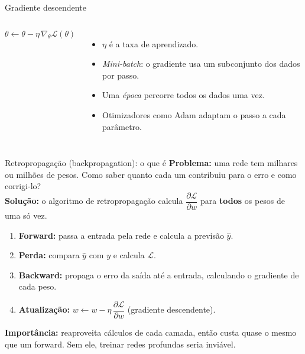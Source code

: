 \documentclass[10pt]{beamer}
\begin{document}
\begin{frame}{Gradiente descendente}
\begin{columns}[c]
\[ \theta\leftarrow\theta-\eta\,\nabla_\theta\mathcal{L}(\theta) \]
\begin{itemize}\small
 \item $\eta$ é a taxa de aprendizado.
 \item \textit{Mini-batch}: o gradiente usa um subconjunto dos dados por passo.
 \item Uma \textit{época} percorre todos os dados uma vez.
 \item Otimizadores como Adam adaptam o passo a cada parâmetro.
\end{itemize}
\end{columns}
\end{frame}

\begin{frame}{Retropropagação (backpropagation): o que é}
\textbf{Problema:} uma rede tem milhares ou milhões de pesos. Como saber quanto cada um contribuiu para o erro e como corrigi-lo?\\[2mm]
\textbf{Solução:} o algoritmo de retropropagação calcula $\dfrac{\partial\mathcal{L}}{\partial w}$ para \textbf{todos} os pesos de uma só vez.
\begin{enumerate}
 \item \textbf{Forward:} passa a entrada pela rede e calcula a previsão $\hat y$.
 \item \textbf{Perda:} compara $\hat y$ com $y$ e calcula $\mathcal{L}$.
 \item \textbf{Backward:} propaga o erro da saída até a entrada, calculando o gradiente de cada peso.
 \item \textbf{Atualização:} $w\leftarrow w-\eta\,\dfrac{\partial\mathcal{L}}{\partial w}$ (gradiente descendente).
\end{enumerate}
\textbf{Importância:} reaproveita cálculos de cada camada, então custa quase o mesmo que um forward. Sem ele, treinar redes profundas seria inviável.
\end{frame}
\end{document}

